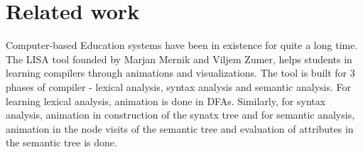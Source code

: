 \chapter{Related work}
\label{chap:related}

Computer-based Education systems have been in existence for quite a long time. The LISA tool \cite{mernik2003educational} founded by Marjan Mernik and Viljem Zumer, helps students in learning compilers through animations and visualizations. The tool is built for 3 phases of compiler - lexical analysis, syntax analysis and semantic analysis. For learning lexical analysis, animation is done in DFAs. Similarly, for syntax analysis, animation in construction of the synatx tree and for semantic analysis, animation in the node visits of the semantic tree and evaluation of attributes in the semantic tree is done.
